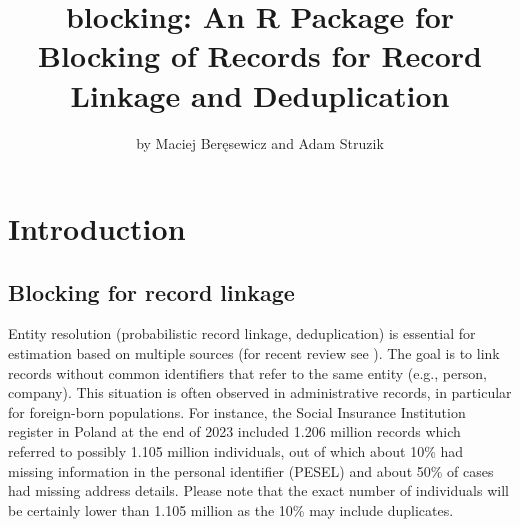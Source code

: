 \title{blocking: An R Package for Blocking of Records for Record Linkage and Deduplication}


\author{by Maciej Beręsewicz and Adam Struzik}

\maketitle


\section{Introduction}\label{introduction}

\subsection{Blocking for record linkage}\label{blocking-for-record-linkage}

Entity resolution (probabilistic record linkage, deduplication) is essential for estimation based on multiple sources (for recent review see \citet{Binette2022}). The goal is to link records without common identifiers that refer to the same entity (e.g., person, company). This situation is often observed in administrative records, in particular for foreign-born populations. For instance, the Social Insurance Institution register in Poland at the end of 2023 included 1.206 million records which referred to possibly 1.105 million individuals, out of which about 10\% had missing information in the personal identifier (PESEL) and about 50\% of cases had missing address details. Please note that the exact number of individuals will be certainly lower than 1.105 million as the 10\% may include duplicates.


